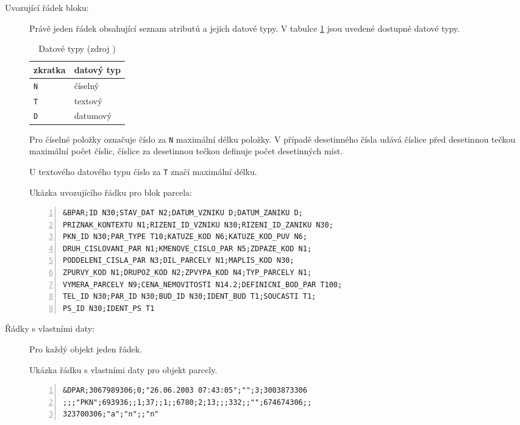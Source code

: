 \begin{description}	
	\item[Uvozující řádek bloku:] Právě jeden řádek obsahující seznam atributů a jejich datové typy. V tabulce \ref{tab:datove_typy} jsou uvedené dostupné datové typy.

		\begin{table}[H]
		\begin{tabular}{|l|l|}
		\hline
		 zkratka & datový typ \\
		\hline
		\hline
		 \texttt{N} & číselný \\ \hline
		 \texttt{T} & textový \\ \hline
		 \texttt{D} & datumový \\
		 \hline
		\end{tabular}
		 \centering
		  \caption{Datové typy (zdroj \citep{struktura_vfk})}
		  \label{tab:datove_typy}
		\end{table}

Pro číselné položky označuje číslo za \texttt{N} maximální délku položky. V případě desetinného čísla udává číslice před desetinnou tečkou maximální počet číslic, číslice za desetinnou tečkou definuje počet desetinných míst.

U textového datového typu číslo za \texttt{T} značí maximální délku.

Ukázka uvozujícího řádku pro blok parcela:

	\begin{lstlisting}[basicstyle=\footnotesize\ttfamily, backgroundcolor = \color{light-gray},  numbers=left]
&BPAR;ID N30;STAV_DAT N2;DATUM_VZNIKU D;DATUM_ZANIKU D;
PRIZNAK_KONTEXTU N1;RIZENI_ID_VZNIKU N30;RIZENI_ID_ZANIKU N30;
PKN_ID N30;PAR_TYPE T10;KATUZE_KOD N6;KATUZE_KOD_PUV N6;
DRUH_CISLOVANI_PAR N1;KMENOVE_CISLO_PAR N5;ZDPAZE_KOD N1;
PODDELENI_CISLA_PAR N3;DIL_PARCELY N1;MAPLIS_KOD N30;
ZPURVY_KOD N1;DRUPOZ_KOD N2;ZPVYPA_KOD N4;TYP_PARCELY N1;
VYMERA_PARCELY N9;CENA_NEMOVITOSTI N14.2;DEFINICNI_BOD_PAR T100;
TEL_ID N30;PAR_ID N30;BUD_ID N30;IDENT_BUD T1;SOUCASTI T1;
PS_ID N30;IDENT_PS T1
	\end{lstlisting}

	\item[Řádky s vlastními daty:] Pro každý objekt jeden řádek.

Ukázka řádku s vlastními daty pro objekt parcely.
	
	\begin{lstlisting}[basicstyle=\footnotesize\ttfamily, backgroundcolor = \color{light-gray},  numbers=left]
&DPAR;3067989306;0;"26.06.2003 07:43:05";"";3;3003873306
;;;"PKN";693936;;1;37;;1;;6780;2;13;;;332;;"";674674306;;
323700306;"a";"n";;"n"
	\end{lstlisting}
\end{description}

